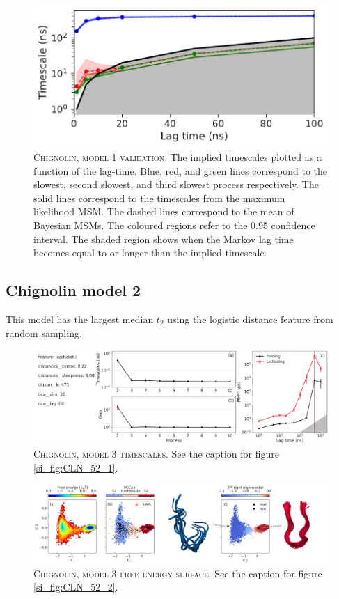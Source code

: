 \documentclass{article}
\begin{document}
\begin{figure}[h]
    \centering
    \includegraphics[height=0.15\textheight]{SI_figures/CLN_52_its.pdf}
    \caption{\textsc{Chignolin, model 1 validation}. The implied timescales plotted as a function of the lag-time. Blue, red, and green lines correspond to the slowest, second slowest, and third slowest process respectively. The solid lines correspond to the timescales from the maximum likelihood MSM. The dashed lines correspond to the mean of Bayesian MSMs. The coloured regions refer to the 0.95 confidence interval. The shaded region shows when the Markov lag time becomes equal to or longer than the implied timescale.}
    \label{si_fig:CLN_52_3}
\end{figure}

\FloatBarrier
\clearpage

\subsection{Chignolin model 2}

This model has the largest median $t_{2}$ using the logistic distance feature from random sampling.

\begin{figure}[h]
    \centering
    \includegraphics[width=0.5\columnwidth]{SI_figures/CLN_23_SI1.pdf}
    \caption{\textsc{Chignolin,  model 3 timescales}.  See the caption for figure \ref{si_fig:CLN_52_1}. }
    \label{si_fig:CLN_24_1}
\end{figure}

\begin{figure}[h]
    \centering
    \includegraphics[width=0.5\columnwidth]{SI_figures/CLN_23_SI2.png}
    \caption{\textsc{Chignolin,  model 3 free energy surface}. See the caption for figure \ref{si_fig:CLN_52_2}.}
    \label{si_fig:CLN_24_2}
\end{figure}
\end{document}

